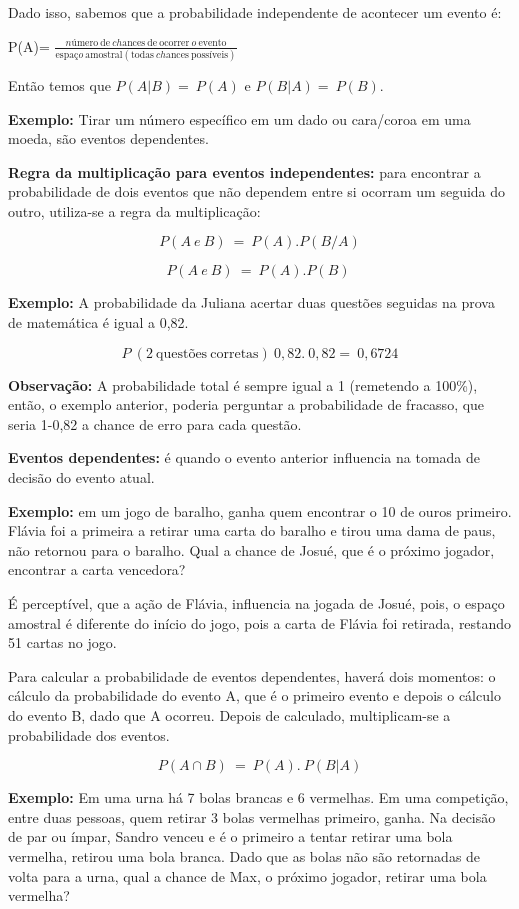 Dado isso, sabemos que a probabilidade independente de acontecer um
evento é:

P(A)=
\(\frac{nú\text{mero}\ \text{de}\ ch\text{ances}\ \text{de}\ \text{ocorrer}\ o\ \text{evento}}{\text{espa}ço\ \text{amostral}(\text{todas}\ ch\text{ances}\ \text{poss}í\text{veis})}\)

Então temos que \(P(A|B) = \ P(A)\) e \(P(B|A) = \ P(B)\).

\textbf{Exemplo:} Tirar um número específico em um dado ou cara/coroa em
uma moeda, são eventos dependentes.

\textbf{Regra da multiplicação para eventos independentes:} para
encontrar a probabilidade de dois eventos que não dependem entre si
ocorram um seguida do outro, utiliza-se a regra da multiplicação:

\[P(A\ e\ B)\  = \ P(A).P(B/A)\]

\[P(A\ e\ B)\  = \ P(A).P(B)\ \]

\textbf{Exemplo:} A probabilidade da Juliana acertar duas questões
seguidas na prova de matemática é igual a 0,82.

\[P\ (2\ \text{quest}õ\text{es}\ \text{corretas})\ 0,82.\ 0,82 = \ 0,6724\]

\textbf{Observação:} A probabilidade total é sempre igual a 1 (remetendo
a 100\%), então, o exemplo anterior, poderia perguntar a probabilidade
de fracasso, que seria 1-0,82 a chance de erro para cada questão.

\textbf{Eventos dependentes:} é quando o evento anterior influencia na
tomada de decisão do evento atual.

\textbf{Exemplo:} em um jogo de baralho, ganha quem encontrar o 10 de
ouros primeiro. Flávia foi a primeira a retirar uma carta do baralho e
tirou uma dama de paus, não retornou para o baralho. Qual a chance de
Josué, que é o próximo jogador, encontrar a carta vencedora?

É perceptível, que a ação de Flávia, influencia na jogada de Josué,
pois, o espaço amostral é diferente do início do jogo, pois a carta de
Flávia foi retirada, restando 51 cartas no jogo.

Para calcular a probabilidade de eventos dependentes, haverá dois
momentos: o cálculo da probabilidade do evento A, que é o primeiro
evento e depois o cálculo do evento B, dado que A ocorreu. Depois de
calculado, multiplicam-se a probabilidade dos eventos.

\[P(A \cap B)\  = \ P(A).\ P(B|A)\]

\textbf{Exemplo:} Em uma urna há 7 bolas brancas e 6 vermelhas. Em uma
competição, entre duas pessoas, quem retirar 3 bolas vermelhas primeiro,
ganha. Na decisão de par ou ímpar, Sandro venceu e é o primeiro a tentar
retirar uma bola vermelha, retirou uma bola branca. Dado que as bolas
não são retornadas de volta para a urna, qual a chance de Max, o próximo
jogador, retirar uma bola vermelha?

